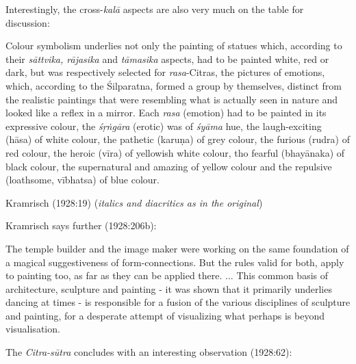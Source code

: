 Interestingly, the cross-\textsl{kalā} aspects are also very much on the table for discussion:

\begin{myquote}
Colour symbolism underlies not only the painting of statues which, according to their \textsl{sāttvika, rājasika} and \textsl{tāmasika} aspects, had to be painted white, red or dark, but was respectively selected for \textsl{rasa}-Citras, the pictures of emotions, which, according to the Śilparatna, formed a group by themselves, distinct from the realistic paintings that were resembling what is actually seen in nature and looked like a reflex in a mirror. Each \textsl{rasa} (emotion) had to be painted in its expressive colour, the \textsl{śṛṅgāra} (erotic) was of \textsl{śyāma} hue, the laugh-exciting (hāsa) of white colour, the pathetic (karuṇa) of grey colour, the furious (rudra) of red colour, the heroic (vīra) of yellowish white colour, tho fearful (bhayānaka) of black colour, the supernatural and amazing of yellow colour and the repulsive (loathsome, vībhatsa) of blue colour.

\hfill Kramrisch (1928:19) (\textsl{italics and diacritics as in the original})
\end{myquote}

Kramrisch says further (1928:206b):

\begin{myquote}
The temple builder and the image maker were working on the same foundation of a magical suggestiveness of form-connections. But the rules valid for both, apply to painting too, as far as they can be applied there. ... This common basis of architecture, sculpture and painting - it was shown that it primarily underlies dancing at times - is responsible for a fusion of the various disciplines of sculpture and painting, for a desperate attempt of visualizing what perhaps is beyond visualisation.
\end{myquote}

The \textsl{Citra-sūtra} concludes with an interesting observation (1928:62): 

